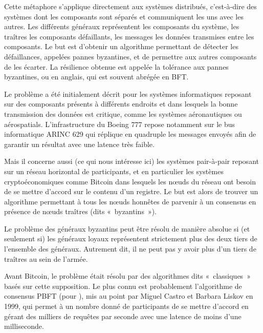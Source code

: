 Cette métaphore s'applique directement aux systèmes distribués, c'est-à-dire des systèmes dont les composants sont séparés et communiquent les uns avec les autres. Les différents généraux représentent les composants du système, les traîtres les composants défaillants, les messages les données transmises entre les composants. Le but est d'obtenir un algorithme permettant de détecter les défaillances, appelées pannes byzantines, et de permettre aux autres composants de les écarter. La résilience obtenue est appelée la tolérance aux pannes byzantines, ou  en anglais, qui est souvent abrégée en BFT.

Le problème a été initialement décrit pour les systèmes informatiques reposant sur des composants présents à différents endroits et dans lesquels la bonne transmission des données est critique, comme les systèmes aéronautiques ou aérospatials. L'infrastructure du Boeing 777 repose notamment sur le bus informatique ARINC 629 qui réplique en quadruple les messages envoyés afin de garantir un résultat avec une latence très faible.

Mais il concerne aussi (ce qui nous intéresse ici) les systèmes pair-à-pair reposant sur un réseau horizontal de participants, et en particulier les systèmes cryptoéconomiques comme Bitcoin dans lesquels les nœuds du réseau ont besoin de se mettre d'accord sur le contenu d'un registre. Le but est alors de trouver un algorithme permettant à tous les nœuds honnêtes de parvenir à un consensus en présence de nœuds traîtres (dits «~byzantins~»).



Le problème des généraux byzantins peut être résolu de manière absolue si (et seulement si) les généraux loyaux représentent strictement plus des deux tiers de l'ensemble des généraux. Autrement dit, il ne peut pas y avoir plus d'un tiers de traîtres au sein de l'armée.

Avant Bitcoin, le problème était résolu par des algorithmes dits «~classiques~» basés sur cette supposition. Le plus connu est probablement l'algorithme de consensus PBFT (pour ), mis au point par Miguel Castro et Barbara Liskov en 1999, qui permet à un nombre donné de participants de se mettre d'accord en gérant des milliers de requêtes par seconde avec une latence de moins d'une milliseconde.


